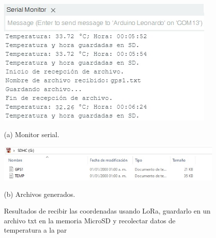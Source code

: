 \begin{itemize}
	\begin{figure}[H]
		\centering
		\begin{minipage}[b]{0.65\textwidth}
			\centering
			\includegraphics[width=\textwidth]{imagenes/data11}
			\caption*{(a) Monitor serial.}
		\end{minipage}
		\quad
		\begin{minipage}[b]{0.65\textwidth}
			\centering
			\includegraphics[width=\textwidth]{imagenes/data12}
			\caption*{(b) Archivos generados.}
		\end{minipage}
		\caption{Resultados de recibir las coordenadas usando LoRa, guardarlo en un archivo
			txt en la memoria MicroSD y recolectar datos de temperatura a la par}
		\label{fig:transmission_results}
	\end{figure}
	

\end{itemize}
